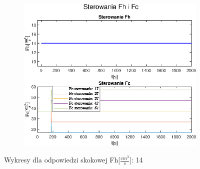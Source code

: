 \begin{figure}[h!]
   \begin{subfigure}[b]{0.6\textwidth}
      \includegraphics[width=1\linewidth]{img/step-responses/stepResponseU14.eps}
      \caption{}
      \label{fig:fig:stepResponsesFh143}
   \end{subfigure}
       
   \caption{Wykresy dla odpowiedzi skokowej Fh[$\frac{cm^3}{s}$]: 14}
   \label{fig:stepResponsesFh14}
\end{figure}
           
